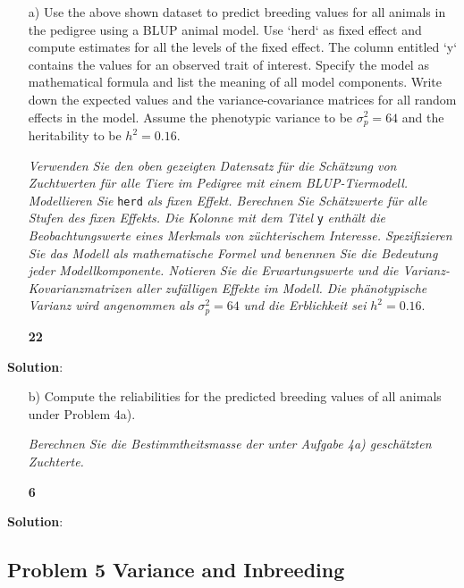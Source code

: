 \documentclass[
]{article}
\newcommand{\points}[1]
{\begin{flushright}\textbf{#1}\end{flushright}}
\newcommand{\solstart}
{\vspace{3ex}\textbf{Solution}:}
\begin{document}
\vspace{3ex}
\begin{enumerate}
\item[a)]  Use the above shown dataset to predict breeding values for all animals in the pedigree using a BLUP animal model. Use `herd` as fixed effect and compute estimates for all the levels of the fixed effect. The column entitled `y` contains the values for an observed trait of interest. Specify the model as mathematical formula and list the meaning of all model components. Write down the expected values and the variance-covariance matrices for all random effects in the model. Assume the phenotypic variance to be $\sigma_p^2 = 64$ and the heritability to be $h^2 = 0.16$.

\textit{Verwenden Sie den oben gezeigten Datensatz für die Schätzung von Zuchtwerten für alle Tiere im Pedigree mit einem BLUP-Tiermodell. Modellieren Sie } \verb+herd+ \textit{als fixen Effekt. Berechnen Sie Schätzwerte für alle Stufen des fixen Effekts. Die Kolonne mit dem Titel} \verb+y+ \textit{enthält die Beobachtungswerte eines Merkmals von züchterischem Interesse. Spezifizieren Sie das Modell als mathematische Formel und benennen Sie die Bedeutung jeder Modellkomponente. Notieren Sie die Erwartungswerte und die Varianz-Kovarianzmatrizen aller zufälligen Effekte im Modell. Die phänotypische Varianz wird angenommen als } $\sigma_p^2 = 64$ \textit{ und die Erblichkeit sei } $h^2 = 0.16$.
\points{22}
\end{enumerate}

\clearpage
\pagebreak

\solstart

\clearpage
\pagebreak

\begin{enumerate}
\item[b)] Compute the reliabilities for the predicted breeding values of all animals under Problem 4a).

\textit{Berechnen Sie die Bestimmtheitsmasse der unter Aufgabe 4a) geschätzten Zuchterte.}
\points{6}
\end{enumerate}

\solstart

\clearpage
\pagebreak

\hypertarget{problem-5-variance-and-inbreeding}{%
\subsection{Problem 5 Variance and
Inbreeding}\label{problem-5-variance-and-inbreeding}}
\end{document}

